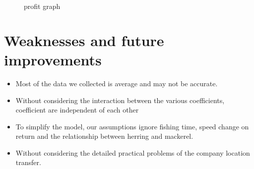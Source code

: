 \documentclass{mcmthesis}
\begin{document}
\begin{figure}[htbp]
  \centering
  \centering
  \caption{profit graph}
\end{figure}


\section{Weaknesses and future improvements}

\begin{itemize}
  \item Most of the data we collected is average and may not be accurate.
   \item Without considering the interaction between the various coefficients, coefficient  are independent of each other
   \item To simplify the model, our assumptions ignore fishing time, speed change on return and the relationship between herring and mackerel.
     \item Without considering the detailed practical problems of the company location transfer.

\end{itemize}
\end{document}

